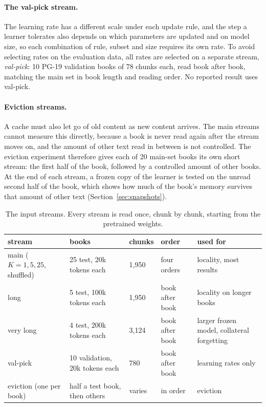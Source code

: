 \documentclass[10pt]{article}
\begin{document}
\paragraph{The val-pick stream.}
The learning rate has a different scale under each update rule, and the step a learner tolerates also depends on which parameters are updated and on model size, so each combination of rule, subset and size requires its own rate.
To avoid selecting rates on the evaluation data, all rates are selected on a separate stream, \emph{val-pick}: 10 PG-19 validation books of 78 chunks each, read book after book, matching the main set in book length and reading order.
No reported result uses val-pick.

\paragraph{Eviction streams.}
A cache must also let go of old content as new content arrives.
The main streams cannot measure this directly, because a book is never read again after the stream moves on, and the amount of other text read in between is not controlled.
The eviction experiment therefore gives each of 20 main-set books its own short stream: the first half of the book, followed by a controlled amount of other books.
At the end of each stream, a frozen copy of the learner is tested on the unread second half of the book, which shows how much of the book's memory survives that amount of other text (Section~\ref{sec:snapshots}).

\begin{table}[t]
\centering\footnotesize\setlength{\tabcolsep}{3.5pt}
\begin{tabular}{lllll}
\toprule
stream & books & chunks & order & used for \\
\midrule
main ($K=1, 5, 25$, shuffled) & 25 test, 20k tokens each & 1{,}950 & four orders & locality, most results \\
long & 5 test, 100k tokens each & 1{,}950 & book after book & locality on longer books \\
very long & 4 test, 200k tokens each & 3{,}124 & book after book & larger frozen model, collateral forgetting \\
val-pick & 10 validation, 20k tokens each & 780 & book after book & learning rates only \\
eviction (one per book) & half a test book, then others & varies & in order & eviction \\
\bottomrule
\end{tabular}
\caption{The input streams. Every stream is read once, chunk by chunk, starting from the pretrained weights.}
\label{tab:streams}
\end{table}
\end{document}
